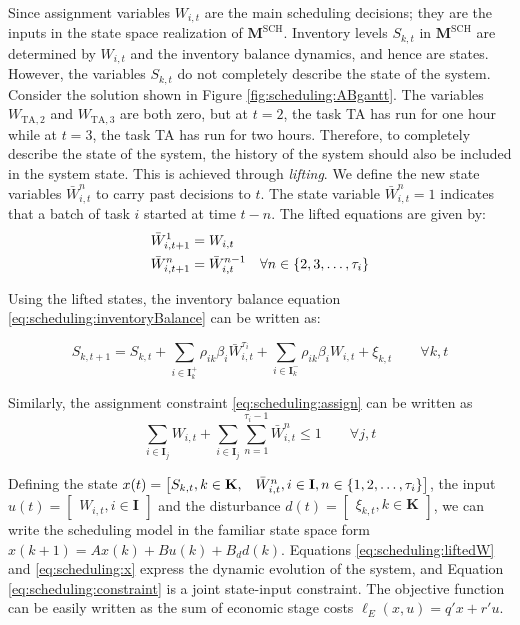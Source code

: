 Since assignment variables $W_{i,t}$ are the main scheduling
decisions; they are the inputs in the state space realization of $\mathbf{M}^{\text{SCH}}$. Inventory
levels $S_{k,t}$ in $\mathbf{M}^{\text{SCH}}$ are determined by
$W_{i,t}$ and the inventory balance dynamics, and hence are states. However, the
variables $S_{k,t}$ do not completely describe the state of the
system. Consider the solution shown in Figure
\ref{fig:scheduling:ABgantt}. The variables $W_{\text{TA},2}$ and
$W_{\text{TA},3}$  are both zero, but at $t=2$, the task TA has run for
one hour while at $t=3$, the task TA has run for two hours. Therefore,
to completely describe the state of the system, the history of the
system should also be included in the system state. This is achieved
through {\em{lifting}}.  We define the new state variables
$\bar{W}_{i,t}^{n}$ to carry past decisions to $t$. The state variable
$\bar{W}_{i,t}^{n} = 1$ indicates that a batch of task $i$ started at
time $t-n$. The lifted equations are given by:
\begin{align}
\label{eq:scheduling:liftedW}
\bar{W}_{i,t+1}^{1} &= W_{i,t} \nonumber \\
\bar{W}_{i,t+1}^{n} &= \bar{W}_{i,t}^{n-1} \quad \forall n \in
\left\lbrace 2,3,\ldots,\tau_i \right\rbrace  
\end{align}

Using the lifted states, the inventory balance equation
\eqref{eq:scheduling:inventoryBalance} can be written as:

\begin{equation}
\label{eq:scheduling:x}
S_{k,t+1} = S_{k,t} + \sum_{i\in
  \mathbf{I}_k^+}\rho_{ik}\beta_i\bar{W}_{i,t}^{\tau_i} + \sum_{i\in
  \mathbf{I}_k^-}\rho_{ik}\beta_iW_{i,t}+ \xi_{k,t} \qquad \forall k,t
\end{equation}

Similarly, the assignment constraint \eqref{eq:scheduling:assign} can
be written as
\begin{equation}
\label{eq:scheduling:constraint}
\sum_{i \in \mathbf{I}_j} W_{i,t} + \sum_{i \in \mathbf{I}_j}
\sum_{n=1}^{\tau_i-1}\bar{W}_{i,t}^{n} \leq 
1 \qquad \forall j,t
\end{equation}

Defining the state $x(t) = \begin{bmatrix}S_{k,t}, k \in \mathbf{K}, &
\bar{W}_{i,t}^{n}, i \in \mathbf{I}, n \in
\left\lbrace 1,2,\ldots,\tau_i \right\rbrace \end{bmatrix}$, the input $u(t)
= \begin{bmatrix} W_{i,t}, i \in \mathbf{I}\end{bmatrix}$ and the 
disturbance $d(t) = \begin{bmatrix} \xi_{k,t}, k \in
  \mathbf{K}\end{bmatrix}$, we can write the 
  scheduling model in the familiar state space form $x(k+1) = 
Ax(k)+Bu(k)+B_dd(k)$. Equations \eqref{eq:scheduling:liftedW} and 
\eqref{eq:scheduling:x} express the dynamic evolution of the system, 
and Equation \eqref{eq:scheduling:constraint} is a joint state-input
constraint. The objective function can be easily written as the sum of
economic stage costs $\ell_E(x,u) = q'x+r'u$.

